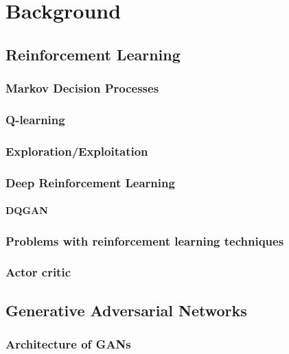 
\chapter{Background} %

\label{Chapter2} %



\section{Reinforcement Learning}

\subsection{Markov Decision Processes}
\subsection{Q-learning}
\subsection{Exploration/Exploitation}
\subsection{Deep Reinforcement Learning}
\subsubsection{DQGAN}
\subsection{Problems with reinforcement learning techniques}
\subsection{Actor critic}


\section{Generative Adversarial Networks}
\subsection{Architecture of GANs}
